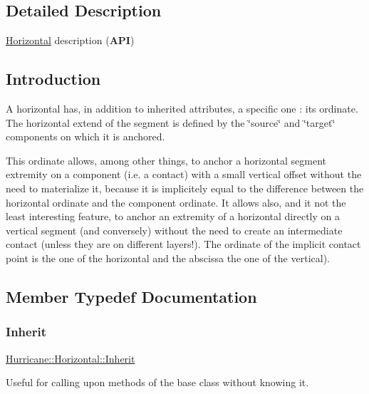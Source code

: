 \subsection{Detailed Description}
\hyperlink{classHurricane_1_1Horizontal}{Horizontal} description ({\bfseries A\+PI}) 

\hypertarget{classHurricane_1_1Horizontal_secHorizontalIntro}{}\subsection{Introduction}\label{classHurricane_1_1Horizontal_secHorizontalIntro}
A horizontal has, in addition to inherited attributes, a specific one \+: its ordinate. The horizontal extend of the segment is defined by the \char`\"{}source\char`\"{} and \char`\"{}target\char`\"{} components on which it is anchored.

This ordinate allows, among other things, to anchor a horizontal segment extremity on a component (i.\+e. a contact) with a small vertical offset without the need to materialize it, because it is implicitely equal to the difference between the horizontal ordinate and the component ordinate. It allows also, and it not the least interesting feature, to anchor an extremity of a horizontal directly on a vertical segment (and conversely) without the need to create an intermediate contact (unless they are on different layers!). The ordinate of the implicit contact point is the one of the horizontal and the abscissa the one of the vertical). 

\subsection{Member Typedef Documentation}
\mbox{\label{classHurricane_1_1Horizontal_a43266e3530dc5872f4eabf16eba86bdb}} 
\subsubsection{\texorpdfstring{Inherit}{Inherit}}
{\footnotesize\ttfamily \hyperlink{classHurricane_1_1Horizontal_a43266e3530dc5872f4eabf16eba86bdb}{Hurricane\+::\+Horizontal\+::\+Inherit}}

Useful for calling upon methods of the base class without knowing it. 


